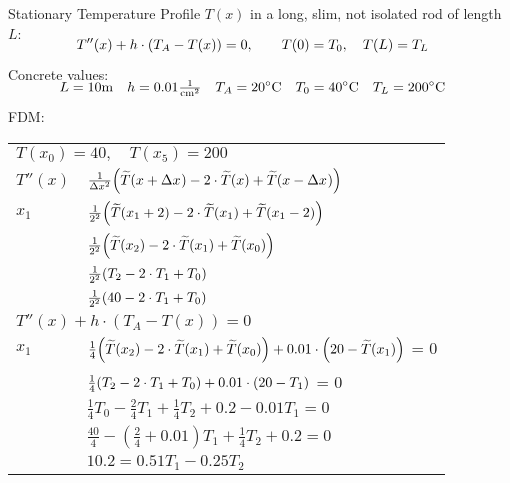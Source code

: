 \documentclass[
	final,
	a4paper,
	oneside,
	parskip=full,
	headings=standardclasses,
	headings=big,
	pointednumbers,
    fleqn
]{scrartcl}
\newcommand{\f}[2]{\frac{#1}{#2}}
\newcommand{\kl}[1]{{\left( #1 \right)}}
\begin{document}
    Stationary Temperature Profile $T\kl{x}$ in a long, slim, not isolated rod of length $L$:
    \begin{align*}
        \SwapAboveDisplaySkip
        T''\kl{x} + h \cdot \kl{T_A - T\kl{x}} = 0, \qquad T\kl{0} = T_0, \quad T\kl{L}=T_L & &
    \end{align*}
    Concrete values:
    \begin{align*}
        \SwapAboveDisplaySkip
        L = 10\mathrm{m} \quad
        h = 0.01 {\textstyle \frac{1}{\mathrm{cm}^2}} \quad
        T_A = 20^\circ\text{C} \quad
        T_0 = 40^\circ\text{C} \quad
        T_L = 200^\circ\text{C} & &
    \end{align*}
    FDM: \\
    \begin{tabular}{p{1cm}l}
        \multicolumn{2}{l}{$T\kl{x_0} = 40, \quad T\kl{x_5}=200$} \\
        $T''\kl{x}$ & $\gpp[\widetilde{T}]$ \\
        $x_1$       & $\gpp[\widetilde{T}][2][2^2][x_1][x_1][x_1]$ \\
                    & $\gpp[\widetilde{T}][][2^2][x_2][x_1][x_0]$ \\
                    & $\gppn[T_2][T_1][T_0][2^2]$ \\
                    & $\gppn[40][T_1][T_0][2^2]$ \\
        \multicolumn{2}{l}{$T''\kl{x} + h \cdot \kl{T_A - T\kl{x}} = 0$} \\
        $x_1$       & $\gpp[\widetilde{T}][][4][x_2][x_1][x_0] + 0.01 \cdot \kl{ 20 - \widetilde{T}\kl{x_1}}$ = 0 \\
                    & $\gppn[T_2][T_1][T_0][4] + 0.01 \cdot \kl{ 20 - T_1}$ = 0 \\
                    & $\f{1}{4} T_0 - \f{2}{4}T_1 + \f{1}{4}T_2 + 0.2 - 0.01 T_1 = 0$ \\
                    & $\f{40}{4} - \kl{\f{2}{4} + 0.01} T_1 + \f{1}{4}T_2 + 0.2 = 0$ \\
                    & $10.2 = 0.51 T_1 - 0.25 T_2$
    \end{tabular}
    
    \newpage
    
\end{document}
